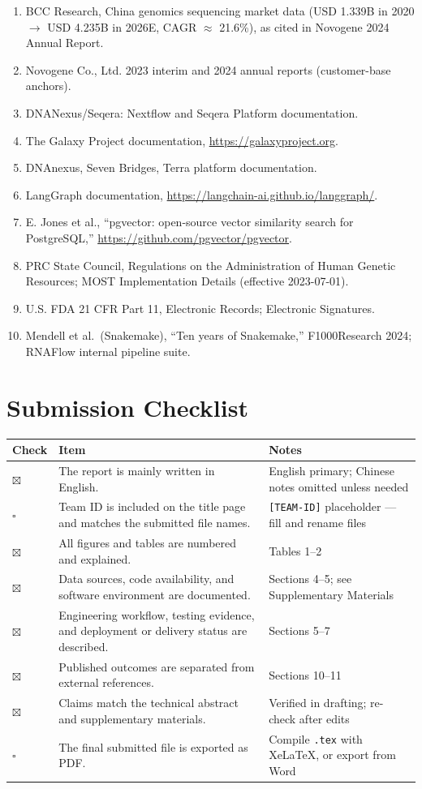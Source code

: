 \documentclass[11pt,a4paper]{article}
\begin{document}
\begin{enumerate}
  \item BCC Research, China genomics sequencing market data (USD 1.339B in 2020 $\rightarrow$ USD 4.235B in 2026E, CAGR $\approx$ 21.6\%), as cited in Novogene 2024 Annual Report.
  \item Novogene Co., Ltd. 2023 interim and 2024 annual reports (customer-base anchors).
  \item DNANexus/Seqera: Nextflow and Seqera Platform documentation.
  \item The Galaxy Project documentation, \url{https://galaxyproject.org}.
  \item DNAnexus, Seven Bridges, Terra platform documentation.
  \item LangGraph documentation, \url{https://langchain-ai.github.io/langgraph/}.
  \item E. Jones et al., ``pgvector: open-source vector similarity search for PostgreSQL,'' \url{https://github.com/pgvector/pgvector}.
  \item PRC State Council, Regulations on the Administration of Human Genetic Resources; MOST Implementation Details (effective 2023-07-01).
  \item U.S. FDA 21 CFR Part 11, Electronic Records; Electronic Signatures.
  \item Mendell et al.\ (Snakemake), ``Ten years of Snakemake,'' F1000Research 2024; RNAFlow internal pipeline suite.
\end{enumerate}

\section{Submission Checklist}
\begin{tabularx}{\textwidth}{p{}X X}
\toprule
\textbf{Check} & \textbf{Item} & \textbf{Notes}\\
\midrule
$\boxtimes$ & The report is mainly written in English. & English primary; Chinese notes omitted unless needed\\
$\square$ & Team ID is included on the title page and matches the submitted file names. & \texttt{[TEAM-ID]} placeholder --- fill and rename files\\
$\boxtimes$ & All figures and tables are numbered and explained. & Tables 1--2\\
$\boxtimes$ & Data sources, code availability, and software environment are documented. & Sections 4--5; see Supplementary Materials\\
$\boxtimes$ & Engineering workflow, testing evidence, and deployment or delivery status are described. & Sections 5--7\\
$\boxtimes$ & Published outcomes are separated from external references. & Sections 10--11\\
$\boxtimes$ & Claims match the technical abstract and supplementary materials. & Verified in drafting; re-check after edits\\
$\square$ & The final submitted file is exported as PDF. & Compile \texttt{.tex} with XeLaTeX, or export from Word\\
\bottomrule
\end{tabularx}
\end{document}
